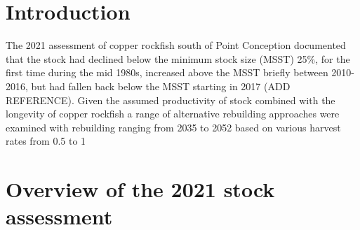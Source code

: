 \documentclass[11pt,
  english,
  a4paper,
]{article}
\begin{document}
\leavevmode\tagmcend\tagstructend\par

\pagebreak
\setlength{\parskip}{5mm plus1mm minus1mm}
\setcounter{page}{1}
\renewcommand{\thefigure}{\arabic{figure}}
\renewcommand{\thetable}{\arabic{table}}
\setcounter{table}{0}
\setcounter{figure}{0}

\setlength\parskip{0.2em plus 0.1em minus 0.2em}


\hypertarget{introduction}{%
\section{Introduction}\label{introduction}}

\leavevmode\tagmcend\tagstructend


The 2021 assessment of copper rockfish south of Point Conception documented that the stock had declined below the minimum stock size (MSST) 25\%, for the first time during the mid 1980s, increased above the MSST briefly between 2010-2016, but had fallen back below the MSST starting in 2017 (ADD REFERENCE). Given the assumed productivity of stock combined with the longevity of copper rockfish a range of alternative rebuilding approaches were examined with rebuilding ranging from 2035 to 2052 based on various harvest rates from 0.5 to 1

\leavevmode\tagmcend\tagstructend\par


\hypertarget{overview-of-the-2021-stock-assessment}{%
\section{Overview of the 2021 stock assessment}\label{overview-of-the-2021-stock-assessment}}

\leavevmode\tagmcend\tagstructend

\end{document}
